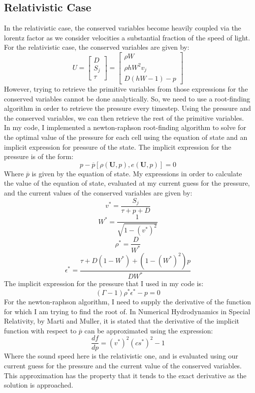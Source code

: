 \subsection{Relativistic Case}
In the relativistic case, the conserved variables become heavily coupled via the lorentz factor as we consider velocities a substantial fraction of the speed of light. For the relativistic case, the conserved variables are given by:
$$U=\begin{bmatrix}D \\ S_j \\ \tau \end{bmatrix} = \begin{bmatrix}\rho W \\ \rho h W^2 v_j \\ D(hW-1)-p \end{bmatrix}$$
However, trying to retrieve the primitive variables from those expressions for the conserved variables cannot be done analytically. So, we need to use a root-finding algorithm in order to retrieve the pressure every timestep. Using the pressure and the conserved variables, we can then retrieve the rest of the primitive variables. \\
In my code, I implemented a newton-raphson root-finding algorithm to solve for the optimal value of the pressure for each cell using the equation of state and an implicit expression for pressure of the state. The implicit expression for the pressure is of the form:
$$p-\overline{p}[\rho(\bm{U},p),e(\bm{U},p)]=0$$
Where $\overline{p}$ is given by the equation of state. My expressions in order to calculate the value of the equation of state, evaluated at my current guess for the pressure, and the current values of the conserved variables are given by:
$$v^{*}=\frac{S_j}{\tau+p+D}$$
$$W^{*}=\frac{1}{\sqrt{1-(v^{*})^2}}$$
$$\rho^{*}=\frac{D}{W^{*}}$$
$$\epsilon^{*}=\frac{\tau +D(1-W^{*})+(1-(W^{*})^2)p}{DW^{*}}$$
The implicit expression for the pressure that I used in my code is:
$$(\Gamma-1)\rho^{*}\epsilon^{*}-p=0$$
For the newton-raphson algorithm, I need to supply the derivative of the function for which I am trying to find the root of. In Numerical Hydrodynamics in Special Relativity, by Marti and Muller, it is stated that the derivative of the implicit function with respect to $\overline{p}$ can be approximated using the expression:
$$\frac{df}{dp}=(v^{*})^2(cs^{*})^2-1$$
Where the sound speed here is the relativistic one, and is evaluated using our current guess for the pressure and the current value of the conserved variables. This approximation has the property that it tends to the exact derivative as the solution is approached.\\
